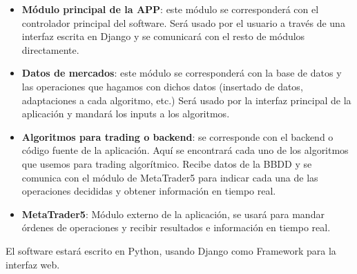\begin{titlepage}
\begin{itemize}
	\item \textbf{Módulo principal de la APP}: este módulo se corresponderá con el controlador principal del software. Será usado por el usuario a través de una interfaz escrita en Django y se comunicará con el resto de módulos directamente.
	\item \textbf{Datos de mercados}: este módulo se corresponderá con la base de datos y las operaciones que hagamos con dichos datos (insertado de datos, adaptaciones a cada algoritmo, etc.) Será usado por la interfaz principal de la aplicación y mandará los inputs a los algoritmos.\newline
	\item \textbf{Algoritmos para trading o backend}: se corresponde con el backend o código fuente de la aplicación. Aquí se encontrará cada uno de los algoritmos que usemos para trading algorítmico. Recibe datos de la BBDD y se comunica con el módulo de MetaTrader5 para indicar cada una de las operaciones decididas y obtener información en tiempo real.
	\item \textbf{MetaTrader5}: Módulo externo de la aplicación, se usará para mandar órdenes de operaciones y recibir resultados e información en tiempo real.
\end{itemize}

El software estará escrito en Python, usando Django como Framework para la interfaz web.

\end{titlepage}